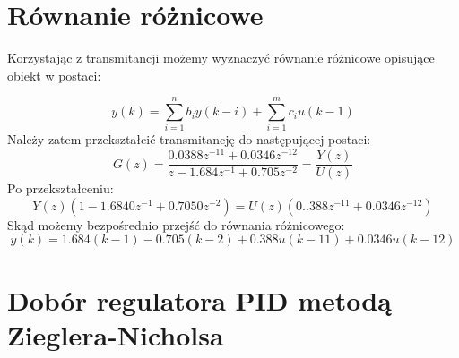 \documentclass[a4paper, 11pt]{article}
\begin{document}
\section{Równanie różnicowe}
Korzystając z transmitancji możemy wyznaczyć równanie różnicowe opisujące obiekt w postaci: 

$$y(k) = \sum_{i=1}^{n} b_iy(k-i)+ \sum_{i=1}^{m} c_iu(k-1)$$
Należy zatem przekształcić transmitancję do następującej postaci: 
$$G(z) = \frac{0.0388z^{-11}+0.0346z^{-12}}{z-1.684z^{-1}+0.705z^{-2}} = \frac{Y(z)}{U(z)}$$
Po przekształceniu: 
$$Y(z)(1-1.6840z^{-1}+0.7050z^{-2}) = U(z)(0..388z^{-11}+0.0346z^{-12})$$
Skąd możemy bezpośrednio przejść do równania różnicowego: 
$$y(k) = 1.684(k-1) - 0.705(k-2) + 0.388u(k-11) + 0.0346u(k-12)$$


\section{Dobór regulatora PID metodą Zieglera-Nicholsa}
\end{document}
